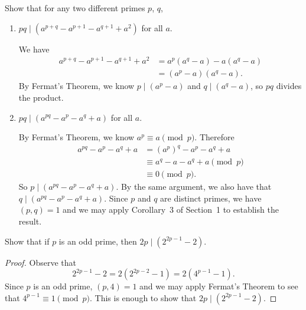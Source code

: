  Show that for any two different primes $p$, $q$,
\begin{enumerate}
\item $pq\mid(a^{p+q} - a^{p+1} - a^{q+1} + a^2)$ for all $a$.
  \begin{solution}
    We have
    \begin{align*}
      a^{p+q} - a^{p+1} - a^{q+1} + a^2
      &= a^p(a^q - a) - a(a^q - a) \\
      &= (a^p - a)(a^q - a).
    \end{align*}
    By Fermat's Theorem, we know $p\mid(a^p - a)$ and
    $q\mid(a^q - a)$, so $pq$ divides the product.
  \end{solution}
\item $pq\mid(a^{pq} - a^p - a^q + a)$ for all $a$.
  \begin{solution}
    By Fermat's Theorem, we know $a^p\equiv a\pmod{p}$. Therefore
    \begin{align*}
      a^{pq} - a^p - a^q + a
      &= (a^p)^q - a^p - a^q + a \\
      &\equiv a^q - a - a^q + a \pmod{p} \\
      &\equiv 0 \pmod{p}.
    \end{align*}
    So $p\mid(a^{pq} - a^p - a^q + a)$. By the same argument, we also
    have that $q\mid(a^{pq} - a^p - a^q + a)$. Since $p$ and $q$ are
    distinct primes, we have $(p,q) = 1$ and we may apply Corollary~3
    of Section~1 to establish the result.
  \end{solution}
\end{enumerate}

 Show that if $p$ is an odd prime, then
$2p\mid(2^{2p-1} - 2)$.
\begin{proof}
  Observe that
  \begin{equation*}
    2^{2p-1} - 2 = 2(2^{2p-2} - 1) = 2(4^{p-1} - 1).
  \end{equation*}
  Since $p$ is an odd prime, $(p,4) = 1$ and we may apply Fermat's
  Theorem to see that $4^{p-1}\equiv1\pmod{p}$. This is enough to show
  that $2p\mid(2^{2p-1} - 2)$.
\end{proof}
